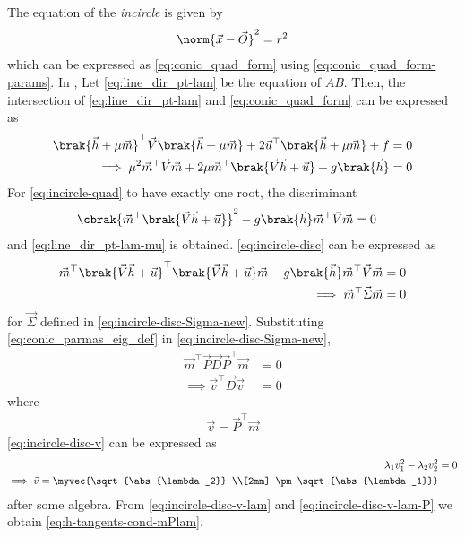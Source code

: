 The equation of the {\em incircle} is given by 
		\begin{align}
			\label{eq:incircle}
			\norm{\vec{x}-\vec{O}}^2 = r^2
		\end{align}
		which can be expressed as 
			 \eqref{eq:conic_quad_form}
			 using 
			 \eqref{eq:conic_quad_form-params}.
	In , 
Let 
  \eqref{eq:line_dir_pt-lam}
  be the equation of $AB$.  Then, the intersection of 
  \eqref{eq:line_dir_pt-lam}
  and 
			 \eqref{eq:conic_quad_form}
			 can be expressed as 
\begin{align}
\brak{\vec{h} + \mu{\vec{m}}}^{\top}
\vec{V}
\brak{\vec{h} + \mu{\vec{m}}}
			+2\vec{u}^{\top}\brak{\vec{h} + \mu{\vec{m}}}+f &= 0
			\\
\implies \mu^2\vec{m}^{\top} \vec{V}\vec{m} + 2\mu \vec{m}^{\top}\brak{\vec{V}\vec{h}+\vec{u}}+g\brak{\vec{h}} &= 0 
	\label{eq:incircle-quad}
\end{align}
For 	\eqref{eq:incircle-quad} to have exactly one root, the discriminant
\begin{align}
 \cbrak{\vec{m}^{\top}\brak{\vec{V}\vec{h}+\vec{u}}}^2 -g\brak{\vec{h}}\vec{m}^{\top} \vec{V}\vec{m}  &= 0 
	\label{eq:incircle-disc}
\end{align}
and 
  \eqref{eq:line_dir_pt-lam-mu}
  is obtained.
	\eqref{eq:incircle-disc}
	can be expressed as
\begin{align}
\vec{m}^{\top}\brak{\vec{V}\vec{h}+\vec{u}}^{\top}\brak{\vec{V}\vec{h}+\vec{u}}\vec{m}-g\brak{\vec{h}}\vec{m}^{\top} \vec{V}\vec{m}  &= 0 
\\
\implies \vec{m}^{\top}\vec{\Sigma}\vec{m} &= 0
	\label{eq:incircle-disc-Sigma-new}
\end{align}
for $\vec{\Sigma}$ defined in 
	\eqref{eq:incircle-disc-Sigma-new}.
      Substituting \eqref{eq:conic_parmas_eig_def}
	in \eqref{eq:incircle-disc-Sigma-new},
\begin{align}
\vec{m}^{\top}\vec{P}\vec{D}\vec{P}^{\top}\vec{m} &= 0
\\
\implies 
\vec{v}^{\top}\vec{D}\vec{v} &= 0
	\label{eq:incircle-disc-v}
\end{align}
where 
\begin{align}
	\label{eq:incircle-disc-v-lam-P}
\vec{v} = \vec{P}^{\top}\vec{m}
\end{align}
	\eqref{eq:incircle-disc-v}
	can be expressed as 
\begin{align}
\lambda_1 v_1^2
-\lambda_2 v_2^2 &= 0
\\
\implies \vec{v} = \myvec{\sqrt{\abs{\lambda_2}} \\[2mm]  \pm \sqrt{\abs{\lambda_1}}}
	\label{eq:incircle-disc-v-lam}
\end{align}
after some algebra.
From 
	\eqref{eq:incircle-disc-v-lam}
	and
	\eqref{eq:incircle-disc-v-lam-P}
	we obtain 
	  \eqref{eq:h-tangents-cond-mPlam}.
